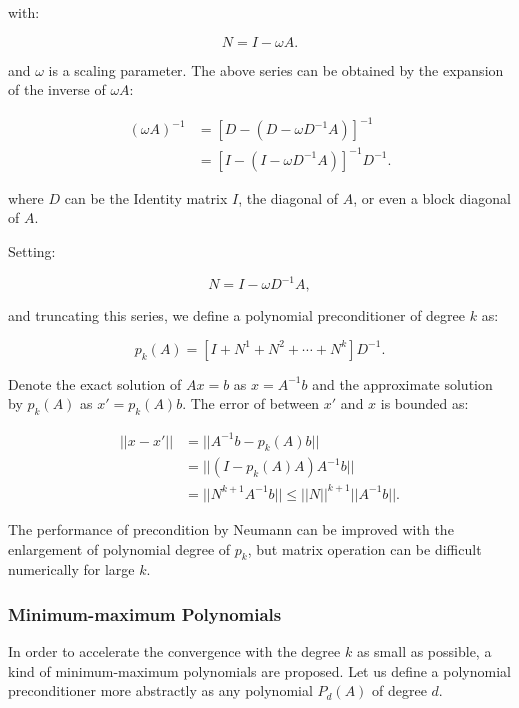 {with:

\begin{equation}
N=I-\omega A.
\end{equation}

and $\omega$ is a scaling parameter. The above series can be obtained by the expansion of the inverse of $\omega A$:

\begin{equation}
\begin{aligned}
(\omega A)^{-1} &= [D-(D- \omega D^{-1}A)]^{-1} \\ &= [I-(I- \omega D^{-1}A)]^{-1}D^{-1}. 
\end{aligned}
\end{equation}

where $D$ can be the Identity matrix $I$, the diagonal of $A$, or even a block diagonal of $A$.

Setting:

\begin{equation}
N=I- \omega D^{-1}A,
\end{equation}

and truncating this series, we define a polynomial preconditioner of degree $k$ as:

\begin{equation}
p_{k}(A) = [I+N^1+N^2+\cdots+N^k]D^{-1}.
\end{equation}

Denote the exact solution of $Ax=b$ as $x=A^{-1}b$ and the approximate solution by $p_{k}(A)$ as $x'=p_{k}(A)b$. The error of between $x'$ and $x$ is bounded as:

\begin{equation}
\begin{aligned}
||x-x'|| &= ||A^{-1}b - p_{k}(A)b|| \\ &= ||(I-p_{k}(A)A)A^{-1}b|| \\ &= ||N^{k+1}A^{-1}b|| \leq ||N||^{k+1}||A^{-1}b||.
\end{aligned}
\end{equation}

The performance of precondition by Neumann can be improved with the enlargement of polynomial degree of $p_k$, but matrix operation can be difficult numerically for large $k$.

\subsubsection{Minimum-maximum Polynomials}

In order to accelerate the convergence with the degree $k$ as small as possible, a kind of minimum-maximum polynomials are proposed. Let us define a polynomial preconditioner more abstractly as any polynomial $P_d(A)$ of degree $d$.

}
